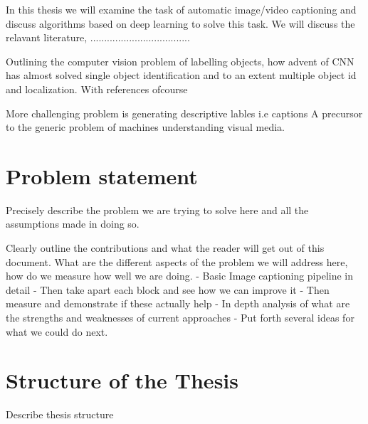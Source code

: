 In this thesis we will examine the task of automatic image/video captioning and
discuss algorithms based on deep learning to solve this task. We will discuss
the relavant literature, ....................................

Outlining the computer vision problem of labelling objects, how advent of CNN
has almost solved single object identification and to an extent multiple object
id and localization. With references ofcourse

More challenging problem is generating descriptive lables i.e captions
A precursor to the generic problem of machines understanding visual media. 


\section{Problem statement}
Precisely describe the problem we are trying to solve here and all the
assumptions made in doing so.

Clearly outline the contributions and what the reader will get out of this
document. What are the different aspects of the problem we will address here,
how do we measure how well we are doing.
    - Basic Image captioning pipeline in detail
    - Then take apart each block and see how we can improve it
    - Then measure and demonstrate if these actually help
    - In depth analysis of  what are the strengths and weaknesses of current
    approaches
    - Put forth several ideas for what we could do next.


\section{Structure of the Thesis}
\label{section:structure} 
Describe thesis structure
